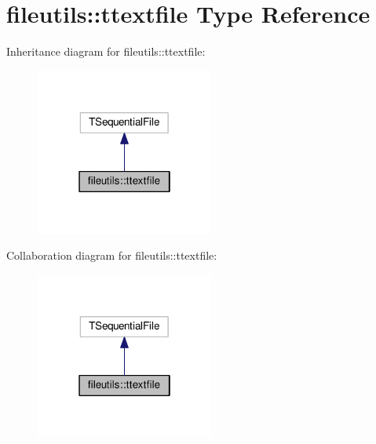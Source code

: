 \hypertarget{structfileutils_1_1ttextfile}{}\section{fileutils\+:\+:ttextfile Type Reference}
\label{structfileutils_1_1ttextfile}


Inheritance diagram for fileutils\+:\+:ttextfile\+:
\nopagebreak
\begin{figure}[H]
\begin{center}
\leavevmode
\includegraphics[width=166pt]{structfileutils_1_1ttextfile__inherit__graph}
\end{center}
\end{figure}


Collaboration diagram for fileutils\+:\+:ttextfile\+:
\nopagebreak
\begin{figure}[H]
\begin{center}
\leavevmode
\includegraphics[width=166pt]{structfileutils_1_1ttextfile__coll__graph}
\end{center}
\end{figure}
